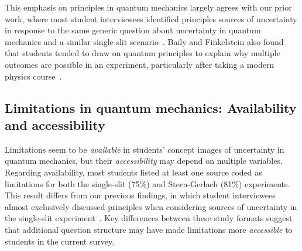 \documentclass[english,aps,prstper,reprint,showpacs,longbibliography,superscriptaddress,nofootinbib]{revtex4-2}
\begin{document}
This emphasis on principles in quantum mechanics largely agrees with our prior work, where most student interviewees identified principles sources of uncertainty in response to the same generic question about uncertainty in quantum mechanics and a similar single-slit scenario~\cite{Stein2019}. Baily and Finkelstein also found that students tended to draw on quantum principles to explain why multiple outcomes are possible in an experiment, particularly after taking a modern physics course~\cite{Baily2009a}.



\subsection{Limitations in quantum mechanics: Availability and accessibility}

Limitations seem to be \emph{available} in students' concept images of uncertainty in quantum mechanics, but their \emph{accessibility} may depend on multiple variables. %
Regarding availability, most students listed at least one source coded as limitations for both the single-slit (75\%) and Stern-Gerlach (81\%) experiments. This result differs from our previous findings, in which student interviewees almost exclusively discussed principles when considering sources of uncertainty in the single-slit experiment~\cite{Stein2019,Stump2020}. Key differences between these study formats suggest that additional question structure may have made limitations more \emph{accessible} to students in the current survey. %
\end{document}
